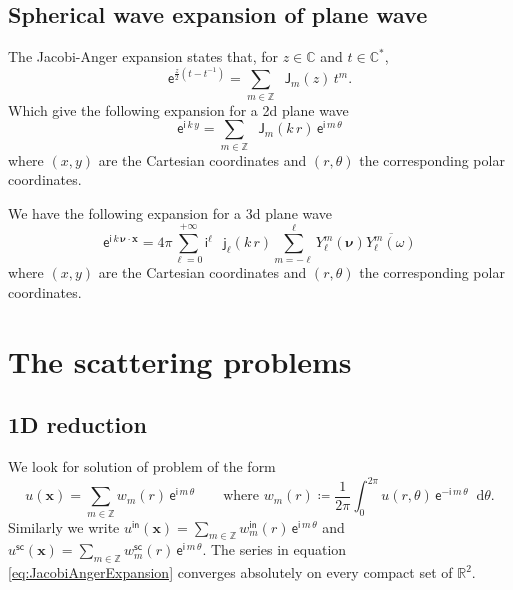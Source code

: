 \documentclass[12pt,a4paper]{article}
\newcommand{\bbC}{\mathbb{C}}
\newcommand{\bbR}{\mathbb{R}}
\newcommand{\bbZ}{\mathbb{Z}}
\newcommand{\ex}{\mathsf{e}}
\newcommand{\im}{\mathsf{i}}
\newcommand{\bJ}{\mathop{}\!\mathsf{J}}
\newcommand{\bj}{\mathop{}\!\mathsf{j}}
\newcommand{\di}[1]{\mathop{}\!\mathrm{d}#1}
\newcommand{\vect}[1]{\boldsymbol{#1}}
\newcommand{\vx}{\boldsymbol{x}}
\newcommand{\inc}{\mathsf{in}}
\newcommand{\sca}{\mathsf{sc}}
\begin{document}
\subsection{Spherical wave expansion of plane wave}

The Jacobi-Anger expansion \cite[Eq.~10.12.1]{NIST:DLMF} states that, for $z \in \bbC$ and $t \in \bbC^*$,
\begin{equation}\label{eq:JacobiAngerExpansion}
    \ex^{\frac{z}{2}(t-t^{-1})} = \sum_{m \in \bbZ} \bJ_m(z)\, t^m.
\end{equation}
Which give the following expansion for a 2d plane wave
\begin{equation}
    \ex^{\im\, k\, y} = \sum_{m \in \bbZ} \bJ_m(k\, r)\, \ex^{\im\, m\, \theta}
\end{equation}
where $(x, y)$ are the Cartesian coordinates and $(r, \theta)$ the corresponding polar coordinates.

We have the following expansion for a 3d plane wave
\begin{equation}
    \ex^{\im\, k\, \vect{\nu} \cdot \vx} = 4\pi \sum_{\ell = 0}^{+\infty} \im^\ell\, \bj_\ell(k\, r) \sum_{m = -\ell}^\ell Y_\ell^m(\vect{\nu}) \overline{Y_\ell^m(\omega)}
\end{equation}
where $(x, y)$ are the Cartesian coordinates and $(r, \theta)$ the corresponding polar coordinates.






\newpage

\section{The scattering problems}

\subsection{1D reduction}

We look for solution of problem of the form
\[
    u(\vx) = \sum_{m \in \bbZ} w_m(r)\, \ex^{\im\, m\, \theta} \qquad
    \text{where } w_m(r) \coloneqq \frac{1}{2\pi} \int_0^{2\pi} u(r,\theta)\, \ex^{-\im\, m\, \theta} \di{\theta}.
\]
Similarly we write $u^\inc(\vx) = \sum_{m \in \bbZ} w_m^\inc(r)\, \ex^{\im\, m\, \theta}$ and $u^\sca(\vx) = \sum_{m \in \bbZ} w_m^\sca(r)\, \ex^{\im\, m\, \theta}$.
The series in equation \eqref{eq:JacobiAngerExpansion} converges absolutely on every compact set of $\bbR^2$.
\end{document}

